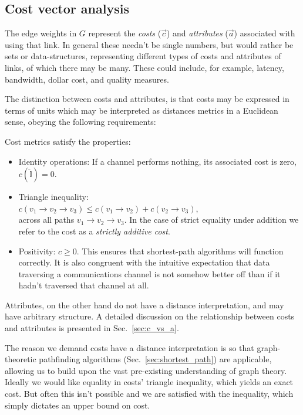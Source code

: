 %
%

\subsection{Cost vector analysis} \label{sec:costs} 

The edge weights in $G$ represent the \textit{costs} ($\vec c$) and \textit{attributes} ($\vec a$) associated with using that link. In general these needn't be single numbers, but would rather be sets or data-structures, representing different types of costs and attributes of links, of which there may be many. These could include, for example, latency, bandwidth, dollar cost, and quality measures.

The distinction between costs and attributes, is that costs may be expressed in terms of units which may be interpreted as distances metrics in a Euclidean sense, obeying the following requirements:

\begin{definition} \label{def:metric} Cost metrics satisfy the properties:
	\begin{itemize}
    	\item Identity operations: If a channel performs nothing, its associated cost is zero, \mbox{$c(\mathbb{\hat{I}}) = 0$}.
    	\item Triangle inequality: \\ $c(v_1\to v_2\to v_3) \leq c(v_1\to v_2) + c(v_2\to v_3)$, \\ across all paths \mbox{$v_1 \to v_2 \to v_3$}. In the case of strict equality under addition we refer to the cost as a \emph{strictly additive cost}.
    	\item Positivity: \mbox{$c\geq 0$}. This ensures that shortest-path algorithms will function correctly. It is also congruent with the intuitive expectation that data traversing a communications channel is not somehow better off than if it hadn't traversed that channel at all.
	\end{itemize}
\end{definition}
Attributes, on the other hand do not have a distance interpretation, and may have arbitrary structure. A detailed discussion on the relationship between costs and attributes is presented in Sec.~\ref{sec:c_vs_a}.

The reason we demand costs have a distance interpretation is so that graph-theoretic pathfinding algorithms (Sec.~\ref{sec:shortest_path}) are applicable, allowing us to build upon the vast pre-existing understanding of graph theory. Ideally we would like equality in costs' triangle inequality, which yields an exact cost. But often this isn't possible and we are satisfied with the inequality, which simply dictates an upper bound on cost.

